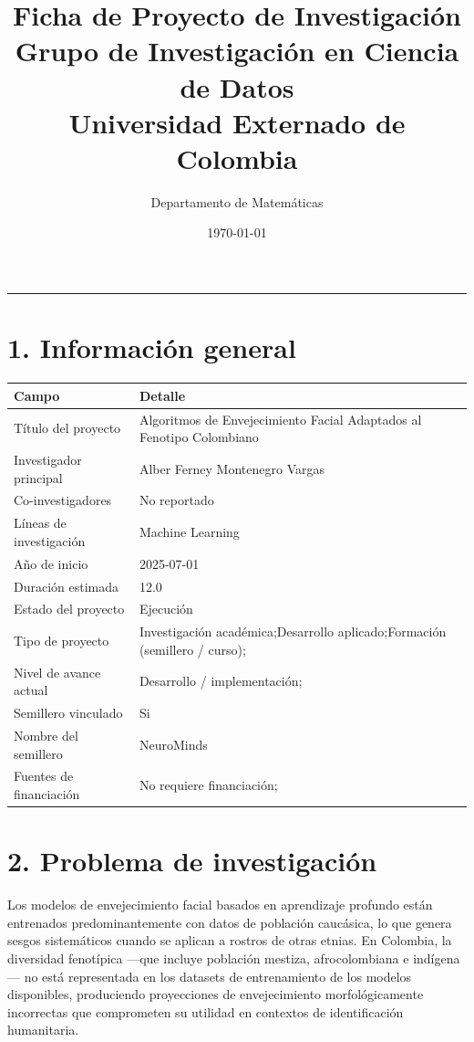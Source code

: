 \documentclass[a4paper,12pt]{article}
\title{
\vspace{-8mm}
\textbf{\textcolor{ExternadoGreen}{Ficha de Proyecto de Investigación}}\\
\large \textcolor{ExternadoDark}{Grupo de Investigación en Ciencia de Datos}\\
\large \textcolor{ExternadoDark}{Universidad Externado de Colombia}
}
\author{\textcolor{ExternadoDark}{Departamento de Matemáticas}}
\date{\textcolor{ExternadoDark}{\today}}
\begin{document}
\maketitle
\vspace{-3mm}
\noindent\textcolor{ExternadoDark}{\rule{\textwidth}{0.6pt}}

\section*{1. Información general}
\begin{longtable}{p{4.2cm} p{10.4cm}}
\toprule
\textbf{Campo} & \textbf{Detalle} \\
\midrule
Título del proyecto & Algoritmos de Envejecimiento Facial Adaptados al Fenotipo Colombiano \\
Investigador principal & Alber Ferney Montenegro Vargas \\
Co-investigadores & No reportado \\
Líneas de investigación & Machine Learning \\
Año de inicio & 2025-07-01 \\
Duración estimada & 12.0 \\
Estado del proyecto & Ejecución \\
Tipo de proyecto & Investigación académica;Desarrollo aplicado;Formación (semillero / curso); \\
Nivel de avance actual & Desarrollo / implementación; \\
Semillero vinculado & Si \\
Nombre del semillero & NeuroMinds \\
Fuentes de financiación & No requiere financiación; \\
\bottomrule
\end{longtable}

\section*{2. Problema de investigación}
Los modelos de envejecimiento facial basados en aprendizaje profundo están entrenados predominantemente con datos de población caucásica, lo que genera sesgos sistemáticos cuando se aplican a rostros de otras etnias. En Colombia, la diversidad fenotípica —que incluye población mestiza, afrocolombiana e indígena— no está representada en los datasets de entrenamiento de los modelos disponibles, produciendo proyecciones de envejecimiento morfológicamente incorrectas que comprometen su utilidad en contextos de identificación humanitaria.
\end{document}
